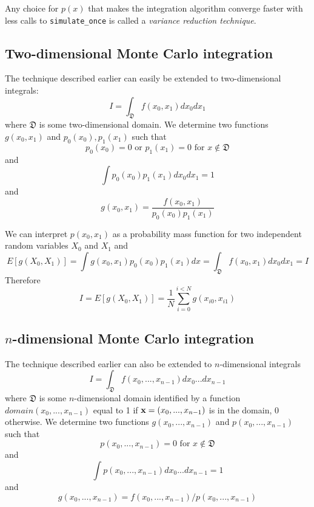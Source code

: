\documentclass[justified, sixbynine]{tufte-book}
\def\ft{\small\tt}
\theoremstyle{plain}%
\newtheorem * {corollary}{Corollary}
\theoremstyle{definition}
\theoremstyle{remark}
\newtheorem * {remark}{Remark}
\newtheorem * {note}{Note}
\begin{document}
\begin{fullwidth}
Any choice for $p(x)$ that makes the integration algorithm converge faster with less calls to {\ft simulate\_once} is called a {\it variance reduction technique}.

\goodbreak\subsection{Two-dimensional Monte Carlo integration}

The technique described earlier can easily be extended to two-dimensional integrals:
\begin{equation}
I=\int_{{\mathfrak D}}f(x_0, x_1)dx_0dx_1
\end{equation}
where ${\mathfrak D}$ is some two-dimensional domain. We determine two functions
$g(x_0, x_1)$ and $p_0(x_0), p_1(x_1)$ such that
\begin{equation}
p_0(x_0)=0\text{ or }p_1(x_1)=0\text{ for }x\notin {\mathfrak D}
\end{equation}
and
\begin{equation}
\int p_0(x_0)p_1(x_1)dx_0dx_1=1
\end{equation}
and
\begin{equation}
g(x_0, x_1)=\frac{f(x_0, x_1)}{p_0(x_0)p_1(x_1)}
\end{equation}

We can interpret $p(x_0, x_1)$ as a probability mass function for two
independent random variables $X_0$ and $X_1$ and
\begin{equation}
E[g(X_0, X_1)]=\int g(x_0, x_1)p_0(x_0)p_1(x_1)dx=\int_{{\mathfrak D}%
}f(x_0, x_1)dx_0dx_1=I
\end{equation}
Therefore
\begin{equation}
I = E[g(X_0, X_1)] = \frac 1N\sum_{i=0}^{i<N}g(x_{i0}, x_{i1})
\end{equation}

\goodbreak\subsection{$n$-dimensional Monte Carlo integration}

The technique described earlier can also be extended to $n$-dimensional integrals
\begin{equation}
I=\int_{{\mathfrak D}}f(x_0, ..., x_{n-1})dx_0...dx_{n-1}
\end{equation}
where ${\mathfrak D}$ is some $n$-dimensional domain identified by a function $%
domain(x_0, ..., x_{n-1})$ equal to 1 if ${\bf x}=(x_0, ..., x_{n-1})$ is in the
domain, 0 otherwise. We determine two functions $g(x_0, ..., x_{n-1})$ and $%
p(x_0, ..., x_{n-1})$ such that
\begin{equation}
p(x_0, ..., x_{n-1})=0\text{ for }x\notin {\mathfrak D}
\end{equation}
and
\begin{equation}
\int p(x_0, ..., x_{n-1})dx_0...dx_{n-1}=1
\end{equation}
and
\begin{equation}
g(x_0, ..., x_{n-1})=f(x_0, ..., x_{n-1})/p(x_0, ..., x_{n-1})
\end{equation}


\end{fullwidth}
\end{document}
